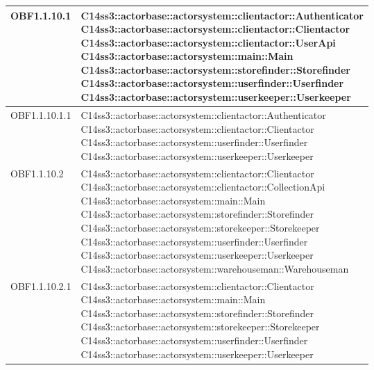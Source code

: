 \documentclass{scalatekids-article}
\begin{document}
\begin{longtable}[H]{|p{4.5cm}|p{13cm}|}
\hline
OBF1.1.10.1 & \multiLineCell[t]{C14ss3::actorbase::actorsystem::clientactor::Authenticator\\C14ss3::actorbase::actorsystem::clientactor::Clientactor\\C14ss3::actorbase::actorsystem::clientactor::UserApi\\C14ss3::actorbase::actorsystem::main::Main\\C14ss3::actorbase::actorsystem::storefinder::Storefinder\\C14ss3::actorbase::actorsystem::userfinder::Userfinder\\C14ss3::actorbase::actorsystem::userkeeper::Userkeeper\\}\\
\hline
OBF1.1.10.1.1 & \multiLineCell[t]{C14ss3::actorbase::actorsystem::clientactor::Authenticator\\C14ss3::actorbase::actorsystem::clientactor::Clientactor\\C14ss3::actorbase::actorsystem::userfinder::Userfinder\\C14ss3::actorbase::actorsystem::userkeeper::Userkeeper\\}\\
\hline
OBF1.1.10.2 & \multiLineCell[t]{C14ss3::actorbase::actorsystem::clientactor::Clientactor\\C14ss3::actorbase::actorsystem::clientactor::CollectionApi\\C14ss3::actorbase::actorsystem::main::Main\\C14ss3::actorbase::actorsystem::storefinder::Storefinder\\C14ss3::actorbase::actorsystem::storekeeper::Storekeeper\\C14ss3::actorbase::actorsystem::userfinder::Userfinder\\C14ss3::actorbase::actorsystem::userkeeper::Userkeeper\\C14ss3::actorbase::actorsystem::warehouseman::Warehouseman\\}\\
\hline
OBF1.1.10.2.1 & \multiLineCell[t]{C14ss3::actorbase::actorsystem::clientactor::Clientactor\\C14ss3::actorbase::actorsystem::main::Main\\C14ss3::actorbase::actorsystem::storefinder::Storefinder\\C14ss3::actorbase::actorsystem::storekeeper::Storekeeper\\C14ss3::actorbase::actorsystem::userfinder::Userfinder\\C14ss3::actorbase::actorsystem::userkeeper::Userkeeper\\}\\

\end{longtable}
\end{document}
